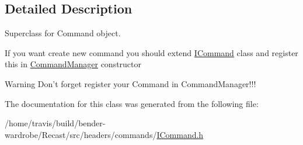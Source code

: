 \subsection{Detailed Description}
Superclass for Command object. 

If you want create new command you should extend \hyperlink{class_i_command}{I\-Command} class and register this in \hyperlink{class_command_manager}{Command\-Manager} constructor

\begin{DoxyWarning}{Warning}
Don't forget register your Command in Command\-Manager!!! 
\end{DoxyWarning}


The documentation for this class was generated from the following file\-:\begin{DoxyCompactItemize}
\item 
/home/travis/build/bender-\/wardrobe/\-Recast/src/headers/commands/\hyperlink{_i_command_8h}{I\-Command.\-h}\end{DoxyCompactItemize}
